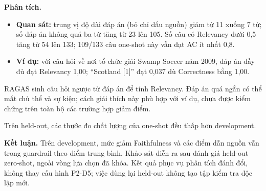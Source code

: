 \textbf{Phân tích.}
\begin{itemize}
\item \textbf{Quan sát:} trung vị độ dài đáp án (bỏ chỉ dấu nguồn) giảm từ 11 xuống 7 từ; số đáp án không quá ba từ tăng từ 23 lên 105. Số câu có Relevancy dưới 0,5 tăng từ 54 lên 133; 109/133 câu one-shot này vẫn đạt AC ít nhất 0,8.
\item \textbf{Ví dụ:} với câu hỏi về nơi tổ chức giải Swamp Soccer năm 2009, đáp án đầy đủ đạt Relevancy 1,00; ``Scotland [1]'' đạt 0,037 dù Correctness bằng 1,00.
\end{itemize}
RAGAS sinh câu hỏi ngược từ đáp án để tính Relevancy. Đáp án quá ngắn có thể mất chủ thể và sự kiện; cách giải thích này phù hợp với ví dụ, chưa được kiểm chứng trên toàn bộ các trường hợp giảm điểm.

Trên held-out, các thước đo chất lượng của one-shot đều thấp hơn development.

\noindent\textbf{Kết luận.} Trên development, mức giảm Faithfulness và các điểm dẫn nguồn vẫn trong guardrail theo điểm trung bình. Khảo sát diễn ra sau đánh giá held-out zero-shot, ngoài vòng lựa chọn đã khóa. Kết quả phục vụ phân tích đánh đổi, không thay cấu hình P2-D5; việc dùng lại held-out không tạo tập kiểm tra độc lập mới.
